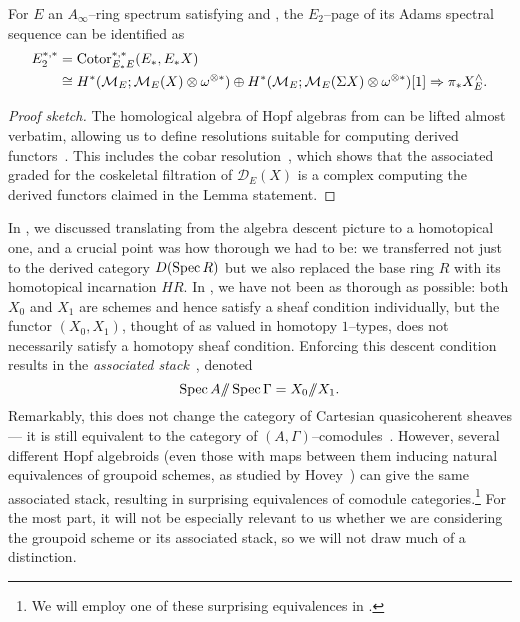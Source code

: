 \begin{lemma}
For $E$ an $A_\infty$--ring spectrum satisfying {\CH} and {\FH}, the $E_2$--page of its Adams spectral sequence can be identified as
\begin{align*}
E_2^{*, *} & = \operatorname{Cotor}_{E_* E}^{*, *}(E_*, E_* X) \\
& \cong H^*(\mathcal{M}_{E}; \mathcal{M}_{E}(X) \otimes \omega^{\otimes *}) \oplus H^*(\mathcal{M}_{E}; \mathcal{M}_{E}(\Sigma X) \otimes \omega^{\otimes *})[1] \Rightarrow \pi_* X^\wedge_E.
\end{align*}
\end{lemma}
\begin{proof}[Proof sketch]
The homological algebra of Hopf algebras from  can be lifted almost verbatim, allowing us to define resolutions suitable for computing derived functors~\cite[Definition A1.2.3]{RavenelGreenBook}.  This includes the cobar resolution~\cite[Definition A1.2.11]{RavenelGreenBook}, which shows that the associated graded for the coskeletal filtration of $\mathcal D_E(X)$ is a complex computing the derived functors claimed in the Lemma statement.
\end{proof}

\begin{remark}\label{WarningAboutStacks}
In , we discussed translating from the algebra descent picture to a homotopical one, and a crucial point was how thorough we had to be: we transferred not just to the derived category $D(\operatorname{Spec} R)$ but we also replaced the base ring $R$ with its homotopical incarnation $HR$.  In , we have not been as thorough as possible: both $X_0$ and $X_1$ are schemes and hence satisfy a sheaf condition individually, but the functor $(X_0, X_1)$, thought of as valued in homotopy $1$--types, does not necessarily satisfy a homotopy sheaf condition.  Enforcing this descent condition results in the \textit{associated stack}~\cite[Definition 8.13]{HopkinsCOCTALOS}, denoted \[\operatorname{Spec} A /\!\!/ \operatorname{Spec} \Gamma = X_0 /\!\!/ X_1.\]  Remarkably, this does not change the category of Cartesian quasicoherent sheaves --- it is still equivalent to the category of $(A, \Gamma)$--comodules~\cite[Proposition 11.6]{HopkinsCOCTALOS}.  However, several different Hopf algebroids (even those with maps between them inducing natural equivalences of groupoid schemes, as studied by Hovey~\cite[Theorem D]{HoveyMoritaThy}) can give the same associated stack, resulting in surprising equivalences of comodule categories.\footnote{We will employ one of these surprising equivalences in .}  For the most part, it will not be especially relevant to us whether we are considering the groupoid scheme or its associated stack, so we will not draw much of a distinction.
\end{remark}

